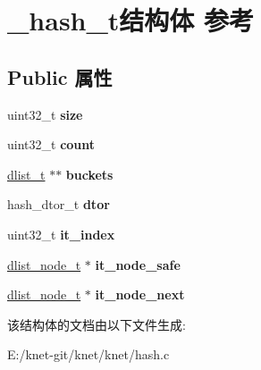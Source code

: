 \hypertarget{struct__hash__t}{}\section{\+\_\+hash\+\_\+t结构体 参考}
\label{struct__hash__t}
\subsection*{Public 属性}
\begin{DoxyCompactItemize}
\item 
\hypertarget{struct__hash__t_a670ef62d04ed8614eb5c921e8610c0eb}{}uint32\+\_\+t {\bfseries size}\label{struct__hash__t_a670ef62d04ed8614eb5c921e8610c0eb}

\item 
\hypertarget{struct__hash__t_a49e8948b5242af0d06671e5a9e4bf299}{}uint32\+\_\+t {\bfseries count}\label{struct__hash__t_a49e8948b5242af0d06671e5a9e4bf299}

\item 
\hypertarget{struct__hash__t_ace932642a1e9be419a96d7bd20d3d0cf}{}\hyperlink{struct__dlist__t}{dlist\+\_\+t} $\ast$$\ast$ {\bfseries buckets}\label{struct__hash__t_ace932642a1e9be419a96d7bd20d3d0cf}

\item 
\hypertarget{struct__hash__t_a440743e5469433eadb5f6150120ecb7b}{}hash\+\_\+dtor\+\_\+t {\bfseries dtor}\label{struct__hash__t_a440743e5469433eadb5f6150120ecb7b}

\item 
\hypertarget{struct__hash__t_a0508ecea0c72d04bae0c5238d14f1b64}{}uint32\+\_\+t {\bfseries it\+\_\+index}\label{struct__hash__t_a0508ecea0c72d04bae0c5238d14f1b64}

\item 
\hypertarget{struct__hash__t_a2ecda37d04a240f7d06d482fd28507c0}{}\hyperlink{struct__dlist__node__t}{dlist\+\_\+node\+\_\+t} $\ast$ {\bfseries it\+\_\+node\+\_\+safe}\label{struct__hash__t_a2ecda37d04a240f7d06d482fd28507c0}

\item 
\hypertarget{struct__hash__t_a2b1764711c152f4aae8619b7fedb005c}{}\hyperlink{struct__dlist__node__t}{dlist\+\_\+node\+\_\+t} $\ast$ {\bfseries it\+\_\+node\+\_\+next}\label{struct__hash__t_a2b1764711c152f4aae8619b7fedb005c}

\end{DoxyCompactItemize}


该结构体的文档由以下文件生成\+:\begin{DoxyCompactItemize}
\item 
E\+:/knet-\/git/knet/knet/hash.\+c\end{DoxyCompactItemize}
